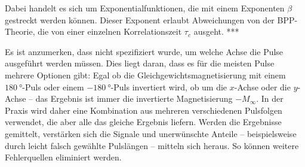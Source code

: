 Dabei handelt es sich um Exponentialfunktionen, die mit einem Exponenten $\beta$ gestreckt werden können. Dieser Exponent erlaubt Abweichungen von der BPP-Theorie, die von einer einzelnen Korrelationszeit $\tau_c$ ausgeht. ***

Es ist anzumerken, dass nicht spezifiziert wurde, um welche Achse die Pulse ausgeführt werden müssen. Dies liegt daran, dass es für die meisten Pulse mehrere Optionen gibt: Egal ob die Gleichgewichtsmagnetisierung mit einem $\SI{180}{\degree}$-Puls oder einem $\SI{-180}{\degree}$-Puls invertiert wird, ob um die $x$-Achse oder die $y$-Achse -- das Ergebnis ist immer die invertierte Magnetisierung $-M_\infty$. In der Praxis wird daher eine Kombination aus mehreren verschiedenen Pulsfolgen verwendet, die aber alle das gleiche Ergebnis liefern. Werden die Ergebnisse gemittelt, verstärken sich die Signale und unerwünschte Anteile -- beispielsweise durch leicht falsch gewählte Pulslängen -- mitteln sich heraus. So können weitere Fehlerquellen eliminiert werden.
